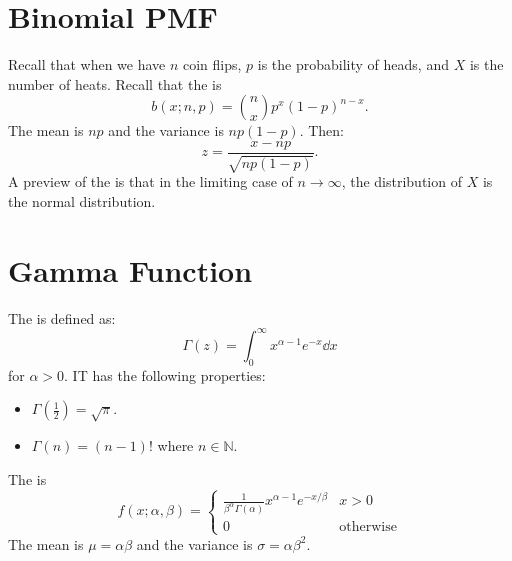 \documentclass{article}
\numberwithin{equation}{section}
\begin{document}
\section{Binomial PMF}
Recall that when we have $n$ coin flips, $p$ is the probability of heads, and $X$ is the number of heats. Recall that the  is
\begin{equation}
    b(x; n, p) = \binom{n}{x} p^x (1-p)^{n-x}.
\end{equation}
The mean is $np$ and the variance is $np(1-p)$. Then:
\begin{equation}
    z = \frac{x-np}{\sqrt{np(1-p)}}.
\end{equation}
A preview of the  is that in the limiting case of $n\rightarrow\infty$, the distribution of $X$ is the normal distribution.
\section{Gamma Function}
The  is defined as:
\begin{equation}
    \Gamma(z) = \int_0^\infty x^{\alpha-1}e^{-x}\dd{x}
\end{equation}
for $\alpha > 0$. IT has the following properties:
\begin{itemize}
    \item $\Gamma\left(\frac{1}{2}\right) = \sqrt{\pi}.$
    \item $\Gamma(n) = (n-1)!$ where $n\in \mathbb{N}.$
\end{itemize}
The  is
\begin{equation}
    f(x; \alpha, \beta) = \begin{cases}
        \frac{1}{\beta^\alpha \Gamma(\alpha)}x^{\alpha-1}e^{-x/\beta} & x > 0 \\ 
        0& \text{otherwise}
    \end{cases}
\end{equation}
The mean is $\mu = \alpha\beta$ and the variance is $\sigma = \alpha\beta^2.$
\end{document}

